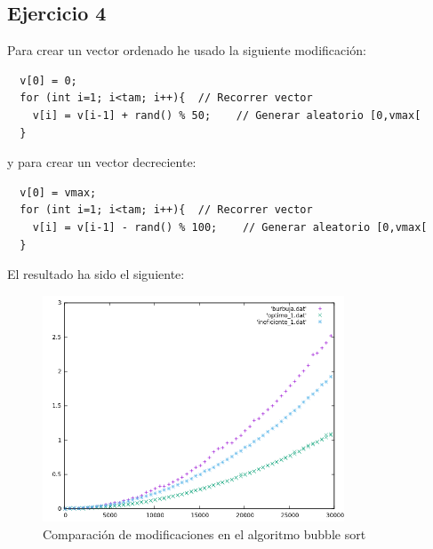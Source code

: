 \subsection*{Ejercicio 4}

Para crear un vector ordenado he usado la siguiente modificación:

\begin{verbatim}
  v[0] = 0;
  for (int i=1; i<tam; i++){  // Recorrer vector
    v[i] = v[i-1] + rand() % 50;    // Generar aleatorio [0,vmax[
  }
\end{verbatim}

y para crear un vector decreciente:

\begin{verbatim}
  v[0] = vmax;
  for (int i=1; i<tam; i++){  // Recorrer vector
    v[i] = v[i-1] - rand() % 100;    // Generar aleatorio [0,vmax[
  }
\end{verbatim}

El resultado ha sido el siguiente:

\begin{figure}[H]
  \caption{Comparación de modificaciones en el algoritmo bubble sort}
  \centering
    \includegraphics[width=0.8\textwidth]{final.png}
\end{figure}